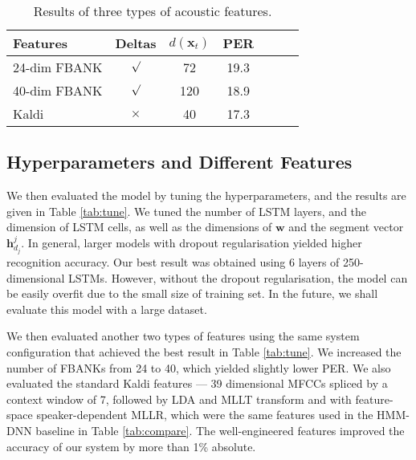 \documentclass[a4paper]{article}
\begin{document}
\begin{table}
 \centering \small
\caption{Results of three types of acoustic features. }\vskip 1.5mm
\label{tab:feautre}
\begin{tabular}{l|cccccc}
\hline

\hline
Features  & Deltas & $d(\mathbf{x}_t)$ & PER  \\ \hline
 24-dim FBANK & $\surd$ & 72 & 19.3 \\
 40-dim FBANK & $\surd$ & 120 & 18.9 \\
 Kaldi & $\times$ & 40 &  17.3 \\ 
 \hline

\hline
\end{tabular}
\vskip-5mm
\end{table}

\subsection{Hyperparameters and Different Features}

We then evaluated the model by tuning the hyperparameters, and the results are given in Table \ref{tab:tune}. We tuned the number of LSTM layers, and the dimension of LSTM cells, as well as the dimensions of $\mathbf{w}$ and the segment vector $\mathbf{h}_{d_j}^j$. In general, larger models with dropout regularisation yielded higher recognition accuracy. Our best result was obtained using 6 layers of 250-dimensional LSTMs. However, without the dropout regularisation, the model can be easily overfit due to the small size of training set. In the future, we shall evaluate this model with a large dataset. 

We then evaluated another two types of features using the same system configuration that achieved the best result in Table \ref{tab:tune}. We increased the number of FBANKs from 24 to 40, which yielded slightly lower PER. We also evaluated the standard Kaldi features --- 39 dimensional MFCCs spliced by a context window of 7, followed by LDA and MLLT transform and with feature-space speaker-dependent MLLR, which were the same features used in the HMM-DNN baseline in Table \ref{tab:compare}. The well-engineered features improved the accuracy of our system by more than 1\% absolute.
\end{document}
